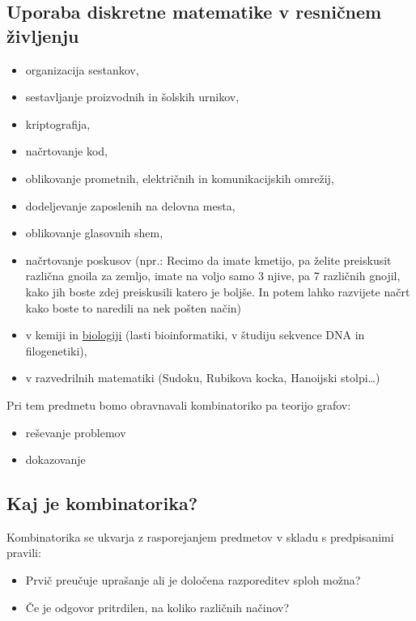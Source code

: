 \subsection{Uporaba diskretne matematike v resničnem življenju}

\begin{itemize}
    \item organizacija sestankov,
    \item sestavljanje proizvodnih in šolskih urnikov,
    \item kriptografija,
    \item načrtovanje kod,
    \item oblikovanje prometnih, električnih in komunikacijskih omrežij,
    \item dodeljevanje zaposlenih na delovna mesta,
    \item oblikovanje glasovnih shem,
    \item načrtovanje poskusov (npr.: Recimo da imate kmetijo, pa želite preiskusit različna gnoila za zemljo, imate na voljo samo 3 njive, pa 7 različnih gnojil, kako jih boste zdej preiskusili katero je boljše. In potem lahko razvijete načrt kako boste to naredili na nek pošten način)
\end{itemize}

\begin{center}

    

\end{center}
\begin{itemize}
    \item v kemiji in \underline{biologiji} (lasti bioinformatiki, v študiju sekvence DNA in filogenetiki),
    \item v razvedrilnih matematiki (Sudoku, Rubikova kocka, Hanoijski stolpi\dots)
\end{itemize}
Pri tem predmetu bomo obravnavali kombinatoriko pa teorijo grafov:
\begin{itemize}
    \item reševanje problemov
    \item dokazovanje
\end{itemize}

\subsection{Kaj je kombinatorika?}
Kombinatorika se ukvarja z rasporejanjem predmetov v skladu s predpisanimi pravili:
\begin{itemize}
    \item Prvič preučuje uprašanje ali je določena razporeditev sploh možna?
    \item Če je odgovor pritrdilen, na koliko različnih načinov?
\end{itemize}

